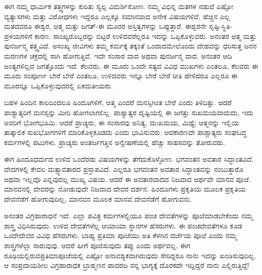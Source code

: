 ಈಗ ನಮ್ಮ ಧಾರ್ಮಿಕ ತತ್ತ್ವಗಳನ್ನು ಕುರಿತು ಸ್ವಲ್ಪ ವಿಮರ್ಶಿಸೋಣ. ನಮ್ಮ ವಿಭಿನ್ನ ಮತಗಳ ನಡುವೆ ಎಷ್ಟೋ ವ್ಯತ್ಯಾಸಗಳು ಮತ್ತು ವಿರೋಧಗಳು ಇದ್ದರೂ ಎಲ್ಲಕ್ಕೂ ಸಮಾನವಾದ ಅನೇಕ ವಿಷಯಗಳಿವೆ. ಹೆಚ್ಚಿನ ಎಲ್ಲ ಮತದವರೂ ಈಶ್ವರ, ಆತ್ಮ ಮತ್ತು ಜಗತ್​-ಈ ಮೂರರ ಅಸ್ತಿತ್ವಗಳನ್ನು ಒಪ್ಪುತ್ತಾರೆ. ಈಶ್ವರನೇ ಸೃಷ್ಟಿ-ಸ್ಥಿತಿ-ಪ್ರಳಯಗಳಿಗೆ ಕಾರಣ. ಸಾಂಖ್ಯರೊಬ್ಬರನ್ನು ಬಿಟ್ಟರೆ ಉಳಿದವರೆಲ್ಲರೂ ಇದನ್ನು ಒಪ್ಪಿಕೊಳ್ಳುವರು. ಅನಂತರ ಆತ್ಮ ಮತ್ತು ಪುನರ್ಜನ್ಮ ತತ್ತ್ವವಿದೆ. ಅಸಂಖ್ಯ ಜೀವಿಗಳು ತಮ್ಮ ಕರ್ಮಕ್ಕೆ ತಕ್ಕಂತೆ ಒಂದಾದಮೇಲೊಂದು ದೇಹವನ್ನು ಧರಿಸುತ್ತ ಜನನ ಮರಣಗಳ ಚಕ್ರದಲ್ಲಿ ಸಾಗಿ ಹೋಗುತ್ತಿವೆ. ಇದೇ ಸಂಸಾರ ವಾದ ಅಥವಾ ಪುನರ್ಜನ್ಮ ವಾದ. ಅನಂತರ ಆದಿ ಅಂತ್ಯಗಳಿಲ್ಲದ ಜಗತ್ತೊಂದು ಇದೆ. ಕೆಲವರು, ಈ ಮೂರು ಒಂದೇ ಸತ್ಯದ ವಿವಿಧ ಮುಖಗಳು ಎಂತಲೂ, ಕೆಲವರು ಈ ಮೂರು ಸಂಪೂರ್ಣ ಬೇರೆ ಬೇರೆ ಎಂತಲೂ, ಉಳಿದವರು ಇನ್ನೂ ಬೇರೆ ಬೇರೆ ರೀತಿ ಹೇಳಿದರೂ ಎಲ್ಲರೂ ಈ ಮೂರನ್ನೂ ಒಪ್ಪಿಕೊಳ್ಳುವುದರಲ್ಲಿ ಏಕಮತೀಯರು.

ಬಹಳ ಹಿಂದಿನ ಕಾಲದಿಂದಲೂ ಹಿಂದೂಗಳಿಗೆ, ಆತ್ಮ ಎಂದರೆ ಮನಸ್ಸಿಗಿಂತ ಬೇರೆ ಎಂದು ತಿಳಿದಿತ್ತು. ಆದರೆ ಪಾಶ್ಯಾತ್ಯರಿಗೆ ಮನಸ್ಸನ್ನು ಮೀರಿ ಹೋಗಲಾಗಲಿಲ್ಲ. ಪಾಶ್ಯಾತ್ಯರ ದೃಷ್ಟಿಯಲ್ಲಿ ಈ ಜಗತ್ತು ಸುಖಮಯವಾದುದು, ಇದು ಅವರಿಗೆ ಭೋಗಭೂಮಿ. ಆದರೆ ಪ್ರಾಚ್ಯರು, ಈ ಸಂಸಾರವು ಅನಿತ್ಯ, ದುಃಖಮಯ, ಮಿಥ್ಯೆ; ಆತ್ಮನನ್ನು ಇಲ್ಲಿಯ ತಾತ್ಕಾಲಿಕ ಸುಖಭೋಗಗಳಿಗೆ ಮಾರಿಕೊಳ್ಳಕೂಡದು ಎಂದು ಭಾವಿಸುವರು. ಆದಕಾರಣವೇ ಪಾಶ್ಚಾತ್ಯರು ಸಂಘಬದ್ಧ ಕರ್ಮಗಳಲ್ಲಿ ಪಟುಗಳು. ಪ್ರಾಚ್ಯರು ಅಂತರ್ಜಗತ್ತಿನ ಅನ್ವೇಷಣೆಯಲ್ಲಿ ಹೆಚ್ಚು ಸಾಹಸವನ್ನು ತೋರುವರು.

ಈಗ ಹಿಂದೂಧರ್ಮದ ಉಳಿದ ಒಂದೆರಡು ವಿಷಯಗಳನ್ನು ತೆಗೆದು\-\break ಕೊಳ್ಳೋಣ. ಭಗವಂತನ ಅವತಾರ ಸಿದ್ಧಾಂತವಿದೆ. ವೇದಗಳಲ್ಲಿ ಕೇವಲ ಮತ್ಸ್ಯಾವತಾರದ ಪ್ರಸ್ತಾಪವಿದೆ. ಎಲ್ಲರೂ ಭಗವಂತನ ಅವತಾರ ಸಿದ್ಧಾಂತವನ್ನು ನಂಬುತ್ತಾರೊ ಅಥವಾ ಇಲ್ಲವೊ ಎನ್ನವುದಲ್ಲ ಮುಖ್ಯ ವಿಷಯ. ಆದರೆ ಈ ಅವತಾರವಾದದ ನಿಜವಾದ ಅರ್ಥವೇ ಮಾನವ ಪೂಜೆ. ಮಾನವನಲ್ಲಿ ದೇವರನ್ನು ನೋಡುವುದೇ ನಿಜವಾದ ದೇವರ ದರ್ಶನ. ಹಿಂದೂಗಳು ಪ್ರಕೃತಿಯ ಮೂಲಕ ಪ್ರಕೃತಿಯ ದೇವನೆಡೆಗೆ ಹೋಗುವುದಿಲ್ಲ, ಮಾನವನ ಮೂಲಕ ಮಾನವ ದೇವನೆಡೆಗೆ ಹೋಗುವನು.

ಅನಂತರ ವಿಗ್ರಹಾರಾಧನೆ ಇದೆ. ಎಲ್ಲಾ ಪವಿತ್ರ ಕರ್ಮಗಳಲ್ಲಿಯೂ ಪಂಚ ದೇವತೆಗಳನ್ನು ಪೂಜೆಮಾಡಬೇಕೆಂದು ನಮ್ಮ ಶಾಸ್ತ್ರ ವಿಧಿಸಿರುವುದು. ಉಳಿದ ದೇವತೆಗಳೆಲ್ಲ ಆಯಾಯಾ ಸ್ಥಾನಗಳ ಹೆಸರುಗಳು. ಈ ಪಂಚದೇವತೆಗಳೂ ಕೂಡ ಒಂದೇದೇವರ ವಿವಿಧ ಹೆಸರುಗಳು. ಬಾಹ್ಯ ಪ್ರತಿಮಾ ಪೂಜೆಯು ಅತಿ ಕೆಳಗಿನ ದರ್ಜೆಯ ಪೂಜೆ ಎಂದು ನಮ್ಮ ಶಾಸ್ತ್ರಗಳೆಲ್ಲಾ ಸಾರುವುವು. ಆದರೆ ಹೀಗೆ ಪೂಜಿಸುವುದು ತಪ್ಪು ಎಂದು ಅರ್ಥವಲ್ಲ. ಈಗ ರೂಢಿಯಲ್ಲಿರುವ\break ಪ್ರತಿಮಾಪೂಜೆಯಲ್ಲಿ ಎಷ್ಟೋ ಅನಾವಶ್ಯಕವಾಗಿರುವುದು ಸೇರಿದ್ದರೂ ನಾನು ಇದನ್ನು ಖಂಡಿಸುವುದಿಲ್ಲ. ಆ ಸಂಪ್ರದಾಯಶೀಲ ವಿಗ್ರಹಾರಾಧಕ ಬ್ರಾಹ್ಮಣನ ಪಾದರಜ ನನ್ನ ಭಾಗ್ಯಕ್ಕೆ ದೊರಕದೇ ಇದ್ದಿದ್ದರೆ ನಾನು ಎಲ್ಲಿರುತ್ತಿದ್ದೆ!

